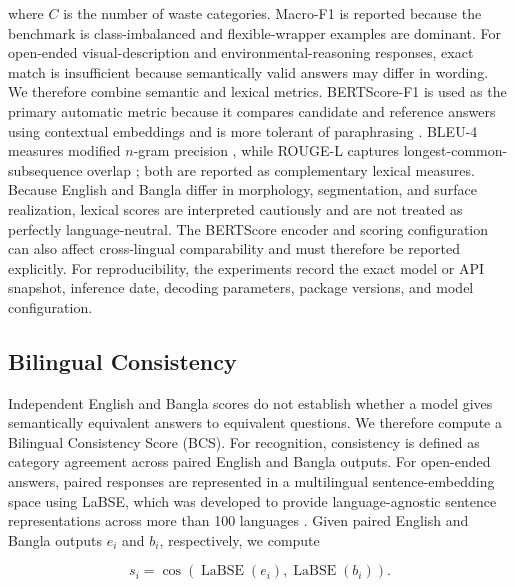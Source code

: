 \documentclass{article}
\begin{document}
where $C$ is the number of waste categories. Macro-F1 is reported because the benchmark is class-imbalanced and flexible-wrapper examples are dominant. For open-ended visual-description and environmental-reasoning responses, exact match is insufficient because semantically valid answers may differ in wording. We therefore combine semantic and lexical metrics. BERTScore-F1 is used as the primary automatic metric because it compares candidate and reference answers using contextual embeddings and is more tolerant of paraphrasing \citep{zhang2020bertscore}. BLEU-4 measures modified $n$-gram precision \citep{papineni2002bleu}, while ROUGE-L captures longest-common-subsequence overlap \citep{lin2004rouge}; both are reported as complementary lexical measures. Because English and Bangla differ in morphology, segmentation, and surface realization, lexical scores are interpreted cautiously and are not treated as perfectly language-neutral. The BERTScore encoder and scoring configuration can also affect cross-lingual comparability and must therefore be reported explicitly. For reproducibility, the experiments record the exact model or API snapshot, inference date, decoding parameters, package versions, and model configuration.
\subsection{Bilingual Consistency}
\label{subsec:bilingual_consistency}

Independent English and Bangla scores do not establish whether a model gives semantically equivalent answers to equivalent questions. We therefore compute a Bilingual Consistency Score (BCS). For recognition, consistency is defined as category agreement across paired English and Bangla outputs. For open-ended answers, paired responses are represented in a multilingual sentence-embedding space using LaBSE, which was developed to provide language-agnostic sentence representations across more than 100 languages \citep{feng2022labse}. Given paired English and Bangla outputs $e_i$ and $b_i$, respectively, we compute

\begin{equation}
s_i =
\cos
\left(
\operatorname{LaBSE}(e_i),
\operatorname{LaBSE}(b_i)
\right).
\label{eq:labse_similarity}
\end{equation}
\end{document}
